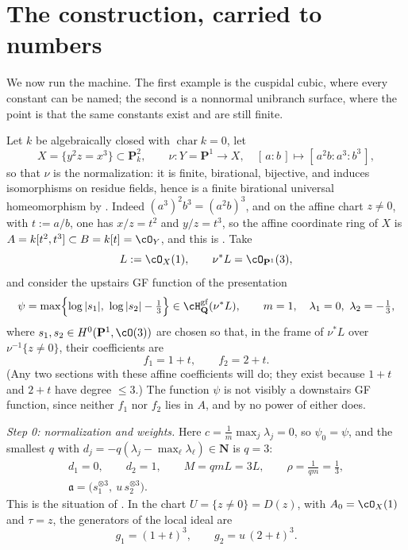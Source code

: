 \section{The construction, carried to numbers}
\label{sec:ch44-computations}

We now run the machine.  The first example is the cuspidal cubic, where
every constant can be named; the second is a nonnormal unibranch surface,
where the point is that the same constants exist and are still finite.

\begin{example}
\label{ex:ch44-cusp-end-to-end}
Let $k$ be algebraically closed with $\operatorname{char}k=0$, let
\[
 X=\{y^2z=x^3\}\subset\mathbf P^2_k,
 \qquad
 \nu:Y=\mathbf P^1\longrightarrow X,
 \quad
 [\,a:b\,]\longmapsto[\,a^2b:a^3:b^3\,],
\]
so that $\nu$ is the normalization: it is finite, birational, bijective,
and induces isomorphisms on residue fields, hence is a finite birational
universal homeomorphism by
.  Indeed
$(a^3)^2b^3=(a^2b)^3$, and on the affine chart $z\ne0$, with
$t:=a/b$, one has $x/z=t^2$ and $y/z=t^3$, so the affine coordinate
ring of $X$ is
$A=k[t^2,t^3]\subset B=k[t]=\cO_Y$, and this is
.  Take
\[
 L:=\cO_X(1),
 \qquad
 \nu^*L=\cO_{\mathbf P^1}(3),
\]
and consider the upstairs GF function of the presentation
\[
 \psi=\max\Bigl\{\log|s_1|,\ \log|s_2|-\tfrac13\Bigr\}
 \in\cH^{\mathrm{gf}}_{\mathbf Q}(\nu^*L),
 \qquad
 m=1,\quad\lambda_1=0,\ \lambda_2=-\tfrac13,
\]
where $s_1,s_2\in H^0(\mathbf P^1,\cO(3))$ are chosen so that, in the
frame of $\nu^*L$ over $\nu^{-1}\{z\ne0\}$, their coefficients are
\[
 f_1=1+t,
 \qquad
 f_2=2+t .
\]
(Any two sections with these affine coefficients will do; they exist because
$1+t$ and $2+t$ have degree $\le3$.)  The function $\psi$ is not
visibly a downstairs GF function, since neither $f_1$ nor $f_2$ lies in
$A$, and by  no power of either does.

\emph{Step 0: normalization and weights.}  Here $c=\frac1m\max_j\lambda_j=0$,
so $\psi_0=\psi$, and the smallest $q$ with
$d_j=-q(\lambda_j-\max_\ell\lambda_\ell)\in\mathbf N$ is $q=3$:
\[
 \begin{gathered}
 d_1=0,\qquad d_2=1,\qquad M=qmL=3L,\qquad
 \rho=\frac1{qm}=\frac13,\\
 \mathfrak a=\bigl(s_1^{\otimes3},\ u\,s_2^{\otimes3}\bigr).
 \end{gathered}
\]
This is the situation of .  In the chart
$U=\{z\ne0\}=D(z)$, with $A_0=\cO_X(1)$ and $\tau=z$, the generators
of the local ideal are
\[
 g_1=(1+t)^3,
 \qquad
 g_2=u\,(2+t)^3 .
\]


\end{example}
